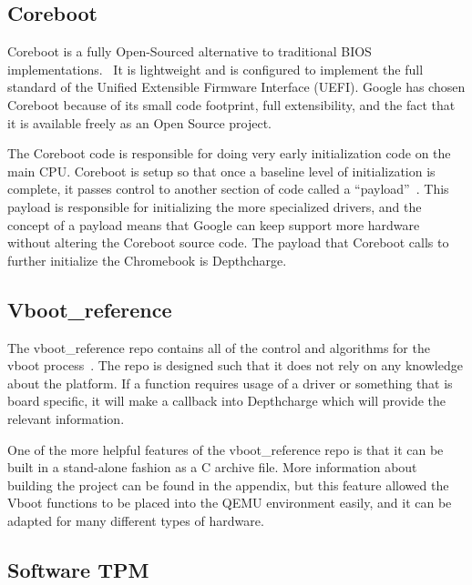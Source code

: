 \subsection{Coreboot}\label{coreboot}

Coreboot is a fully Open-Sourced alternative to traditional BIOS implementations.~\cite{coreboot}
It is lightweight and is configured to implement the full standard of the Unified Extensible Firmware Interface (UEFI).
Google has chosen Coreboot because of its small code footprint, full extensibility, and the fact that it is available freely as an Open Source project.

The Coreboot code is responsible for doing very early initialization code on the main CPU\@. 
Coreboot is setup so that once a baseline level of initialization is complete, it passes control to another section of code called a ``payload''~\cite{coreboot-payload}.
This payload is responsible for initializing the more specialized drivers, and the concept of a payload means that Google can keep support more hardware without altering the Coreboot source code.
The payload that Coreboot calls to further initialize the Chromebook is Depthcharge.

\subsection{Vboot\_reference}

The vboot\_reference repo contains all of the control and algorithms for the vboot process~\cite{vboot-codebase}.
The repo is designed such that it does not rely on any knowledge about the platform.
If a function requires usage of a driver or something that is board specific, it will make a callback into Depthcharge which will provide the relevant information.

One of the more helpful features of the vboot\_reference repo is that it can be
built in a stand-alone fashion as a C archive file.
More information about building the project can be found in the appendix, but
this feature allowed the Vboot functions to be placed into the QEMU environment
easily, and it can be adapted for many different types of hardware.

\subsection{Software TPM}

